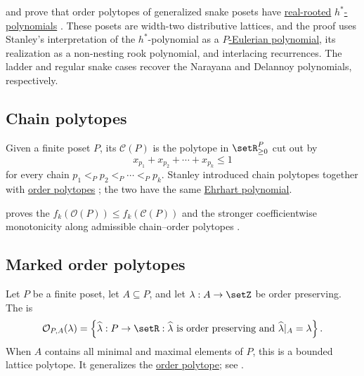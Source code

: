  and  prove that order polytopes of
generalized snake posets have \hyperref[realRootedPolynomial]{real-rooted}
\hyperref[hStarPolynomial]{$h^*$-polynomials}
\cite{BraunJal2026x}.  These posets are width-two distributive lattices, and
the proof uses Stanley's interpretation of the $h^*$-polynomial as a
\hyperref[pEulerianPolynomial]{$P$-Eulerian polynomial}, its realization as a
non-nesting rook polynomial, and interlacing recurrences.  The ladder and
regular snake cases recover the Narayana and Delannoy polynomials,
respectively.


\subsection[chainPolytope]{Chain polytopes}

Given a finite poset $P$, its
\label{chainPolytopeDefinition}
$\mathcal{C}(P)$ is the
polytope in $\setR_{\geq 0}^{P}$ cut out by
\[
  x_{p_1}+x_{p_2}+\dotsb+x_{p_k}\leq 1
\]
for every chain $p_1<_P p_2<_P\dotsb<_P p_k$.  Stanley introduced chain
polytopes together with
\hyperref[orderPolytopeDefinition]{order polytopes}
\cite{Stanley86TwoPosetPolytopes}; the two have the same
\hyperref[ehrhartPolynomialDefinition]{Ehrhart polynomial}.

 proves the
\label{hibiLiFaceNumberConjecture}
$f_k(\mathcal O(P))\leq f_k(\mathcal C(P))$ and the stronger coefficientwise
monotonicity along admissible chain--order polytopes
\cite[Thm.~1.1]{Fourier2026HibiLi}.



\subsection[markedOrderPolytope]{Marked order polytopes}

Let $P$ be a finite poset, let $A\subseteq P$, and let
$\lambda:A\to\setZ$ be order preserving.  The
\label{markedOrderPolytopeDefinition}
is
\[
 \mathcal O_{P,A}(\lambda)
 =
 \left\{
   \widehat\lambda:P\to\setR:
   \widehat\lambda\text{ is order preserving and }
   \widehat\lambda|_A=\lambda
 \right\}.
\]
When $A$ contains all minimal and maximal elements of $P$, this is a bounded
lattice polytope.  It generalizes the
\hyperref[orderPolytopeDefinition]{order polytope}; see
\cite{ArdilaBliemSalazar2011}.

